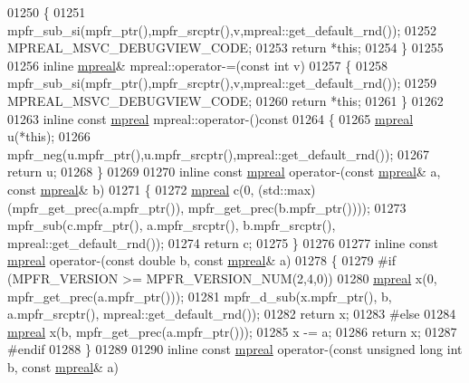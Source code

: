 \begin{DoxyCode}
01250 \{
01251     mpfr\_sub\_si(mpfr\_ptr(),mpfr\_srcptr(),v,mpreal::get\_default\_rnd());
01252     MPREAL\_MSVC\_DEBUGVIEW\_CODE;
01253     \textcolor{keywordflow}{return} *\textcolor{keyword}{this};
01254 \}
01255 
01256 \textcolor{keyword}{inline} \hyperlink{classmpfr_1_1mpreal}{mpreal}& mpreal::operator-=(\textcolor{keyword}{const} \textcolor{keywordtype}{int} v)
01257 \{
01258     mpfr\_sub\_si(mpfr\_ptr(),mpfr\_srcptr(),v,mpreal::get\_default\_rnd());
01259     MPREAL\_MSVC\_DEBUGVIEW\_CODE;
01260     \textcolor{keywordflow}{return} *\textcolor{keyword}{this};
01261 \}
01262 
01263 \textcolor{keyword}{inline} \textcolor{keyword}{const} \hyperlink{classmpfr_1_1mpreal}{mpreal} mpreal::operator-()\textcolor{keyword}{const}
01264 \textcolor{keyword}{}\{
01265     \hyperlink{classmpfr_1_1mpreal}{mpreal} u(*\textcolor{keyword}{this});
01266     mpfr\_neg(u.mpfr\_ptr(),u.mpfr\_srcptr(),mpreal::get\_default\_rnd());
01267     \textcolor{keywordflow}{return} u;
01268 \}
01269 
01270 \textcolor{keyword}{inline} \textcolor{keyword}{const} \hyperlink{classmpfr_1_1mpreal}{mpreal} operator-(\textcolor{keyword}{const} \hyperlink{classmpfr_1_1mpreal}{mpreal}& a, \textcolor{keyword}{const} \hyperlink{classmpfr_1_1mpreal}{mpreal}& b)
01271 \{
01272   \hyperlink{classmpfr_1_1mpreal}{mpreal} c(0, (std::max)(mpfr\_get\_prec(a.mpfr\_ptr()), mpfr\_get\_prec(b.mpfr\_ptr())));
01273   mpfr\_sub(c.mpfr\_ptr(), a.mpfr\_srcptr(), b.mpfr\_srcptr(), mpreal::get\_default\_rnd());
01274   \textcolor{keywordflow}{return} c;
01275 \}
01276 
01277 \textcolor{keyword}{inline} \textcolor{keyword}{const} \hyperlink{classmpfr_1_1mpreal}{mpreal} operator-(\textcolor{keyword}{const} \textcolor{keywordtype}{double}  b, \textcolor{keyword}{const} \hyperlink{classmpfr_1_1mpreal}{mpreal}& a)
01278 \{
01279 \textcolor{preprocessor}{#if (MPFR\_VERSION >= MPFR\_VERSION\_NUM(2,4,0))}
01280     \hyperlink{classmpfr_1_1mpreal}{mpreal} x(0, mpfr\_get\_prec(a.mpfr\_ptr()));
01281     mpfr\_d\_sub(x.mpfr\_ptr(), b, a.mpfr\_srcptr(), mpreal::get\_default\_rnd());
01282     \textcolor{keywordflow}{return} x;
01283 \textcolor{preprocessor}{#else}
01284     \hyperlink{classmpfr_1_1mpreal}{mpreal} x(b, mpfr\_get\_prec(a.mpfr\_ptr()));
01285     x -= a;
01286     \textcolor{keywordflow}{return} x;
01287 \textcolor{preprocessor}{#endif}
01288 \}
01289 
01290 \textcolor{keyword}{inline} \textcolor{keyword}{const} \hyperlink{classmpfr_1_1mpreal}{mpreal} operator-(\textcolor{keyword}{const} \textcolor{keywordtype}{unsigned} \textcolor{keywordtype}{long} \textcolor{keywordtype}{int} b, \textcolor{keyword}{const} \hyperlink{classmpfr_1_1mpreal}{mpreal}& a)

\end{DoxyCode}
